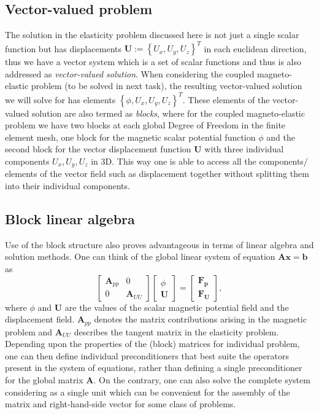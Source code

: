 \documentclass[11pt,a4paper,final]{article}
\begin{document}
\subsection{\textbf{Vector-valued problem}} The solution in the elasticity problem discussed here is not just a single scalar function but has displacements $\mathbf{U} := \left\lbrace U_x, U_y, U_z \right\rbrace^T$ in each euclidean direction, thus we have a vector system which is a set of scalar functions and thus is also addressed as \textit{vector-valued solution}. When considering the coupled magneto-elastic problem (to be solved in next task), the resulting vector-valued solution we will solve for has elements $\left\lbrace \phi, U_x, U_y, U_z \right\rbrace^T$. These elements of the vector-valued solution are also termed as \textit{blocks}, where for the coupled magneto-elastic problem we have two blocks at each global Degree of Freedom in the finite element mesh, one block for the magnetic scalar potential function $\phi$ and the second block for the vector displacement function $\mathbf{U}$ with three individual components $U_x, U_y, U_z$ in 3D. This way one is able to access all the components/ elements of the vector field such as displacement together without splitting them into their individual components. 
\subsection{\textbf{Block linear algebra}} Use of the block structure also proves advantageous in terms of linear algebra and solution methods. One can think of the global linear system of equation $\mathbf{A}\mathbf{x} = \mathbf{b}$ as
\begin{equation*}
\begin{bmatrix}
\mathbf{A}_{pp} & 0 \\
0 & \mathbf{A}_{UU} 
\end{bmatrix}
\begin{bmatrix}
\phi \\
\mathbf{U}
\end{bmatrix} 
= 
\begin{bmatrix}
\mathbf{F_p} \\
\mathbf{F_U}
\end{bmatrix},
\end{equation*}
where $\phi$ and $\mathbf{U}$ are the values of the scalar magnetic potential field and the displacement field. $\mathbf{A}_{pp}$ denotes the matrix contributions arising in the magnetic problem and $\mathbf{A}_{UU}$ describes the tangent matrix in the elasticity problem. Depending upon the properties of the (block) matrices for individual problem, one can then define individual preconditioners that best suite the operators present in the system of equations, rather than defining a single preconditioner for the global matrix $\mathbf{A}$. On the contrary, one can also solve the complete system considering as a single unit which can be convenient for the assembly of the matrix and right-hand-side vector for some class of problems. 
\end{document}
